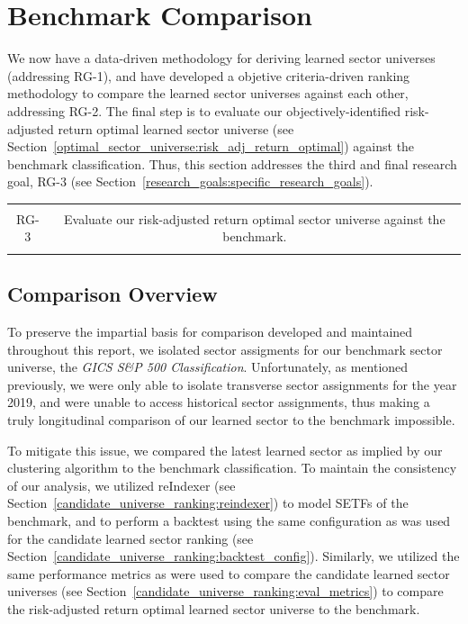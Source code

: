 \documentclass[../main.tex]{subfiles}
\begin{document}
\chapter{Benchmark Comparison}

We now have a data-driven methodology for deriving learned sector universes (addressing RG-1), and have developed a objetive criteria-driven ranking methodology to compare the learned sector universes against each other, addressing RG-2. The final step is to evaluate our objectively-identified risk-adjusted return optimal learned sector universe (see Section~\ref{optimal_sector_universe:risk_adj_return_optimal}) against the benchmark classification. Thus, this section addresses the third and final research goal, RG-3 (see Section~\ref{research_goals:specific_research_goals}).

\begin{table}[h!]
    \centering
    \begin{tabular}{| c | c |}
        \hline
        &  \\
        RG-3 & Evaluate our risk-adjusted return optimal sector universe against the benchmark. \\
        & \\
        \hline
    \end{tabular}
\end{table}

\section{Comparison Overview}

To preserve the impartial basis for comparison developed and maintained throughout this report, we isolated sector assigments for our benchmark sector universe, the \textit{GICS S\&P 500 Classification}. Unfortunately, as mentioned previously, we were only able to isolate transverse sector assignments for the year 2019, and were unable to access historical sector assignments, thus making a truly longitudinal comparison of our learned sector to the benchmark impossible.

To mitigate this issue, we compared the latest learned sector as implied by our clustering algorithm to the benchmark classification. To maintain the consistency of our analysis, we utilized reIndexer (see Section~\ref{candidate_universe_ranking:reindexer}) to model SETFs of the benchmark, and to perform a backtest using the same configuration as was used for the candidate learned sector ranking (see Section~\ref{candidate_universe_ranking:backtest_config}). Similarly, we utilized the same performance metrics as were used to compare the candidate learned sector universes (see Section~\ref{candidate_universe_ranking:eval_metrics}) to compare the risk-adjusted return optimal learned sector universe to the benchmark.
\end{document}
